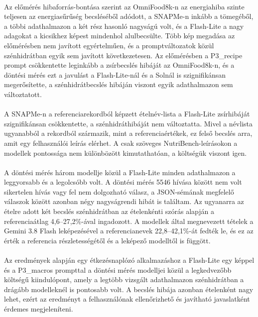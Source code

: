 \paragraph{}Az előmérés hibaforrás-bontása szerint az OmniFood8k-n az energiahiba szinte teljesen az 
energiasűrűség becsléséből adódott, a SNAPMe-n inkább a tömegéből, a többi adathalmazon a két rész 
hasonló nagyságú volt, és a Flash-Lite a nagy adagokat a kicsikhez képest mindenhol alulbecsülte. 
Több kép megadása az előmérésben nem javított egyértelműen, és a promptváltozatok közül 
szénhidrátban egyik sem javított következetesen. Az előmérésben
a P3\_recipe prompt csökkentette leginkább a zsírbecslés hibáját az OmniFood8k-n, és a döntési mérés 
ezt a javulást a Flash-Lite-nál és a Solnál is szignifikánsan megerősítette, a szénhidrátbecslés 
hibáján viszont egyik adathalmazon sem változtatott.

\paragraph{}A SNAPMe-n a referenciarekordból képzett ételnév-lista a Flash-Lite zsírhibáját 
szignifikánsan csökkentette, a szénhidráthibáját nem változtatta. Mivel a névlista ugyanabból a 
rekordból származik, mint a referenciaértékek, ez felső becslés arra, amit egy felhasználói leírás 
elérhet. A csak szöveges NutriBench-leírásokon a modellek pontossága nem különbözött kimutathatóan, 
a költségük viszont igen.

\paragraph{}A döntési mérés három modellje közül a Flash-Lite minden adathalmazon a leggyorsabb és a legolcsóbb volt. A döntési 
mérés 5546 hívása között nem volt sikertelen hívás vagy fel nem dolgozható válasz, a JSON-sémának 
megfelelő válaszok között azonban négy nagyságrendi hibát is találtam. Az ugyanarra az ételre adott 
két becslés szénhidrátban az ételenkénti szórás alapján a referenciaátlag 4,6--27,2\%-ával 
ingadozott. A modellek által megnevezett tételek a Gemini 3.8 Flash leképezésével a referencianevek 
22,8--42,1\%-át fedték le, és ez az érték a referencia részletességétől és a leképező modelltől is 
függött.

\paragraph{}Az eredmények alapján egy étkezésnaplózó alkalmazáshoz a Flash-Lite egy képpel és a 
P3\_macros prompttal a döntési mérés modelljei közül a legkedvezőbb költségű kiindulópont, amely a 
legtöbb vizsgált adathalmazon szénhidrátban a drágább modelleknél is pontosabb volt. A becslés hibája 
azonban ételenként nagy lehet, ezért az eredményt a felhasználónak ellenőrizhető és javítható 
javaslatként érdemes megjeleníteni.


